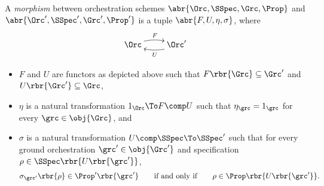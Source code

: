 \documentclass{LMCS}
\begin{document}
  \begin{defi}
    \label{definition:morphism-of-orchestration-schemes}
    A \emph{morphism} between orchestration schemes \(\abr{\Orc, \SSpec, \Grc, \Prop}\) and \(\abr{\Orc', \SSpec', \Grc', \Prop'}\) is a tuple \(\abr{F, U, \eta, \sigma}\), where
    \[
    \xymatrix {
      {\Orc}
      \ar @/^/ [r] ^{F}
      & {\Orc'}
      \ar @/^/ [l] ^{U}
    }
    \]
    \begin{itemize}

    \item \(F\) and \(U\) are functors as depicted above such that \(F\rbr{\Grc} \subseteq \Grc'\) and \(U\rbr{\Grc'} \subseteq \Grc\),

    \item \(\eta\) is a natural transformation \(1_{\Orc} \To F \comp U\) such that \(\eta_{\grc} = 1_{\grc}\) for every \(\grc \in \obj{\Grc}\), and
      
    \item \(\sigma\) is a natural transformation \(U \comp \SSpec \To \SSpec'\) such that for every ground orchestration \(\grc' \in \obj{\Grc'}\) and specification \(\rho \in \SSpec\rbr{U\rbr{\grc'}}\),
      \[
      \sigma_{\grc'}\rbr{\rho} \in \Prop'\rbr{\grc'}
      \qquad \text{if and only if} \qquad
      \rho \in \Prop\rbr{U\rbr{\grc'}}.
      \]

    \end{itemize}
  \end{defi}
\end{document}
